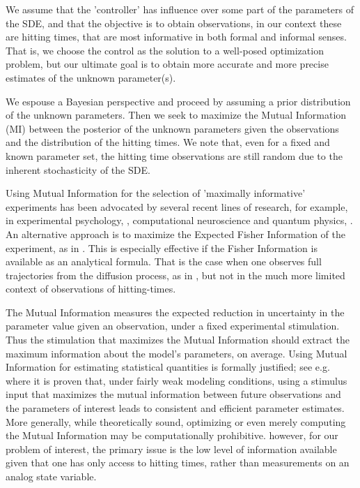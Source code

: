 \documentclass{article}
\begin{document}
We assume that the 'controller' has influence over some part of the parameters
of the SDE, and that the objective is to obtain observations, in our context
these are hitting times, that are most informative in both formal and informal
senses. That is, we choose the control as the solution to a
well-posed optimization problem, but our ultimate goal is to obtain more
accurate and more precise estimates of the unknown parameter(s).

We espouse a Bayesian perspective and proceed by assuming a prior
distribution of the unknown parameters. Then we seek to maximize the Mutual
Information (MI) between the posterior of the unknown parameters given the
observations and the distribution of the hitting times. We note that, even for a
fixed and known parameter set, the hitting time observations 
are still random due to the inherent stochasticity of the SDE. 

Using Mutual Information for the selection of 'maximally informative'
experiments has been advocated by several recent lines of research, for example,
in experimental psychology, \cite{Cavagnaro2010,Myung2013}, computational
neuroscience \cite{Paninski2006a,Paninski2005,Lewi2009} and quantum physics,
\cite{Granade2012}. An alternative approach is to maximize the Expected Fisher
Information of the experiment, as in \cite{Hooker2015}. This is especially
effective if the Fisher Information is available as an analytical formula. That
is the case when one observes full trajectories from the diffusion process, as
in \cite{Hooker2015}, but not in the much more limited context of observations
of hitting-times. 
 
The Mutual Information measures the expected reduction in uncertainty in the
parameter value given an observation, under a fixed experimental stimulation.
Thus the stimulation that maximizes the Mutual Information should extract the
maximum information about the model's parameters, on average. Using Mutual
Information for estimating statistical quantities is formally justified; see
e.g. \cite{Paninski2005} where it is proven that, under fairly weak modeling
conditions, using a stimulus input that maximizes the mutual information between
future observations and the parameters of interest leads to consistent and
efficient parameter estimates. More generally, while theoretically sound,
optimizing or even merely computing the Mutual Information may be
computationally prohibitive. however, for our problem of interest, the primary
issue is the low level of information available given that one has only access
to hitting times, rather than measurements on an analog state variable.
\end{document}
